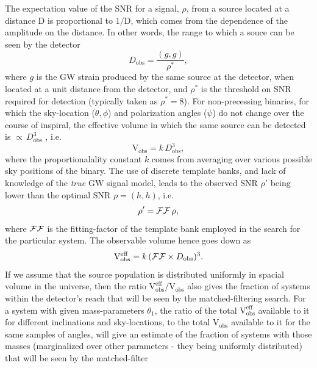 The expectation value of the SNR for a signal, $\rho$, from a source located at
a distance $\mathrm{D}$ 
is proportional to $1/\mathrm{D}$, which comes from the dependence of the 
amplitude on the distance. In other words, the range to which a
souce can be seen by the detector
\begin{equation}
 D_{\mathrm{obs}} = \dfrac{(g,g)}{\rho^*},
\end{equation}
where $g$ is the GW strain produced by the same source at the detector, when 
located at a unit distance from the detector, and $\rho^*$ is the threshold on 
SNR required for
detection (typically taken as $\rho^* = 8$). For non-precessing binaries, for 
which the sky-location ($\theta,\phi$) and polarization angles ($\psi$) do not change over the course of
inspiral, the effective volume in which the same source can be detected is $\propto\,D_{\mathrm{obs}}^3$ \cite{Finn:1992xs}, i.e.
\begin{equation}
 \mathrm{V}_{\mathrm{obs}} = k\,D_{\mathrm{obs}}^3,
\end{equation}
where the proportionalality constant $k$ comes from averaging over various 
possible sky positions of the
binary. The use of discrete template banks, and lack of knowledge of the 
\textit{true} GW signal model, leads to the observed SNR $\rho'$ being lower 
than the optimal SNR $\rho = (h,h)$, i.e.
\begin{equation}
 \rho' = \mathcal{FF} \, \rho,
\end{equation}
where $\mathcal{FF}$ is the fitting-factor of the template bank employed in the search
for the particular system. The observable volume hence goes down as
\begin{equation}
 \mathrm{V}^{\mathrm{eff}}_{\mathrm{obs}} = k\, (\mathcal{FF}\times D_{\mathrm{obs}})^3.
\end{equation}
If we assume that the source population is distributed uniformly in spacial 
volume in the universe, then the ratio
$\mathrm{V}^{\mathrm{eff}}_{\mathrm{obs}}/\mathrm{V}_{\mathrm{obs}}$ also gives
the fraction of systems within the detector's reach that will be seen by the 
matched-filtering search. For a system with given mass-parameters $\theta_1$, the ratio of
the total $\mathrm{V}^{\mathrm{eff}}_{\mathrm{obs}}$ available to it
for different inclinations and sky-locations, to the total
$\mathrm{V}_{\mathrm{obs}}$ available to it for the same samples of angles, 
will give an estimate of the fraction of systems with those masses (marginalized over other
parameters - they being uniformly distributed) that will be seen by the matched-filter
